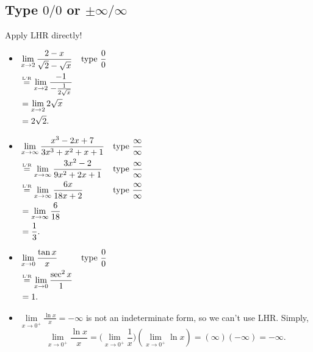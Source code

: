 \subsection*{Type $ 0/0 $ or $ \pm\infty/\infty $}
Apply LHR directly!
\begin{Example}{}{}
    \begin{itemize}
        \item $ \begin{aligned}[t]
                       & \lim\limits_{{x} \to {2}}\frac{2-x}{\sqrt{2}-\sqrt{x}}        &  & \text{type }\frac{0}{0} \\
                       & \stackrel{\text{\tiny L'R}}{=} \lim\limits_{{x} \to {2}}\frac{-1}{-\frac{1}{2\sqrt{x}}}                              \\
                       & =\lim\limits_{{x} \to {2}}2\sqrt{x}                                                        \\
                       & =2\sqrt{2}.
                  \end{aligned} $
        \item $ \begin{aligned}[t]
                       & \lim\limits_{{x} \to {\infty}}\frac{x^3-2x+7}{3x^3+x^2+x+1} &  & \text{type }\frac{\infty}{\infty} \\
                       & \stackrel{\text{\tiny L'R}}{=} \lim\limits_{{x} \to {\infty}}\frac{3x^2-2}{9x^2+2x+1} &  & \text{type }\frac{\infty}{\infty} \\
                       & \stackrel{\text{\tiny L'R}}{=} \lim\limits_{{x} \to {\infty}}\frac{6x}{18x+2}         &  & \text{type }\frac{\infty}{\infty} \\
                       & =\lim\limits_{{x} \to {\infty}}\frac{6}{18}                                                        \\
                       & =\frac{1}{3}.
                  \end{aligned} $
        \item $ \begin{aligned}[t]
                       & \lim\limits_{{x} \to {0}}\frac{\tan x}{x}        &  & \text{type }\frac{0}{0} \\
                       & \stackrel{\text{\tiny L'R}}{=} \lim\limits_{{x} \to {0}}\frac{\sec^2 x}{1}                              \\
                       & =1.
                  \end{aligned} $
        \item $ \displaystyle \lim\limits_{{x} \to {0^+}}\frac{\ln x}{x}=-\infty $ is not an indeterminate form, so we can't use LHR\@. Simply,
              \[ \lim\limits_{{x} \to {0^+}}\frac{\ln x}{x}=
                  \biggl(\lim\limits_{{x} \to {0^+}}\frac{1}{x}\biggr)(\lim\limits_{{x} \to {0^+}}\ln x)=(\infty)(-\infty)=-\infty. \]
    \end{itemize}
\end{Example}
